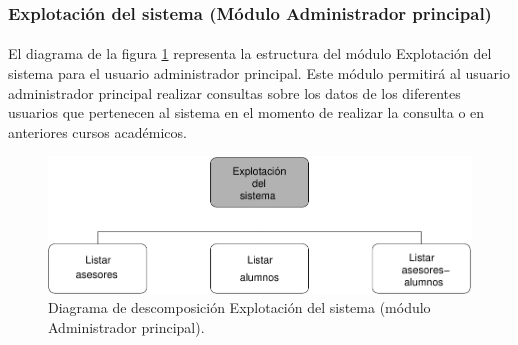 \subsubsection{Explotación del sistema (Módulo Administrador principal)}

  \paragraph{}El diagrama de la figura
  \ref{diagramaDescomposicionExplotacionSistema} representa la estructura del
  módulo Explotación del sistema para el usuario administrador principal.
  Este módulo permitirá al usuario administrador principal realizar consultas
  sobre los datos de los diferentes usuarios que pertenecen al sistema en el
  momento de realizar la consulta o en anteriores cursos académicos.

  \begin{figure}[!ht]
    \begin{center}
      \includegraphics[]{11.Disenyo_Arquitectonico/11.2.Diagramas_Descomposicion/11.2.2.Modulo_administrador_principal/ExplotacionSistema/Diagramas/explotacion_sistema.pdf}
      \caption{Diagrama de descomposición Explotación del sistema (módulo Administrador principal).}
      \label{diagramaDescomposicionExplotacionSistema}
    \end{center}
  \end{figure}